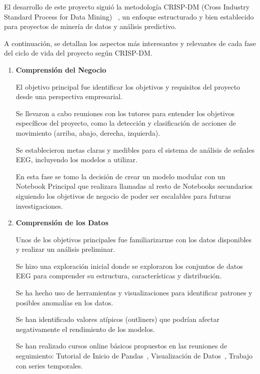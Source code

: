 


El desarrollo de este proyecto siguió la metodología CRISP-DM (Cross Industry Standard Process for Data Mining) ~\cite{wiki:CRISP}, un enfoque estructurado y bien establecido para proyectos de minería de datos y análisis predictivo. 

A continuación, se detallan los aspectos más interesantes y relevantes de cada fase del ciclo de vida del proyecto según CRISP-DM.


\begin{enumerate}
\def\labelenumi{\arabic{enumi}.}	
\item
\textbf{Comprensión del Negocio}

El objetivo principal fue identificar los objetivos y requisitos del proyecto desde una perspectiva empresarial.

Se llevaron a cabo reuniones con los tutores para entender los objetivos específicos del proyecto, como la detección y clasificación de acciones de movimiento (arriba, abajo, derecha, izquierda).

Se establecieron metas claras y medibles para el sistema de análisis de señales EEG, incluyendo los modelos a utilizar.

En esta fase se tomo la decisión de crear un modelo modular con un Notebook Principal que realizara llamadas al resto de Notebooks secundarios siguiendo los objetivos de negocio de poder ser escalables para futuras investigaciones.


\item
\textbf{Comprensión de los Datos}

Unos de los objetivos principales fue familiarizarme con los datos disponibles y realizar un análisis preliminar.

Se hizo una exploración inicial donde se exploraron los conjuntos de datos EEG para comprender su estructura, características y distribución.

Se ha hecho uso de herramientas y visualizaciones para identificar patrones y posibles anomalías en los datos.

Se han identificado valores atípicos (outliners) que podrían afectar negativamente el rendimiento de los modelos.

Se han realizado cursos online básicos propuestos en las reuniones de seguimiento:
Tutorial de Inicio de Pandas~\cite{curso:a}, Visualización de Datos~\cite{curso:b}, Trabajo con series temporales.~\cite{curso:c}


\end{enumerate}
